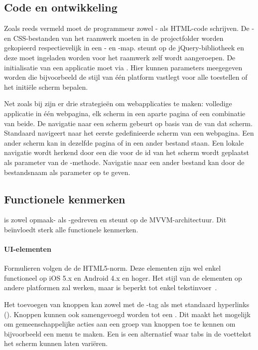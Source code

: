 \subsection{Code en ontwikkeling}
Zoals reeds vermeld moet de programmeur zowel \js{}- als HTML-code schrijven. 
De \js{}- en CSS-bestanden van het raamwerk moeten in de projectfolder worden gekopieerd respectievelijk in een - en -map.
\kendo{} steunt op de jQuery-bibliotheek en deze moet ingeladen worden voor het \kendo{} raamwerk zelf wordt aangeroepen.
De initialisatie van een applicatie moet via .
Hier kunnen parameters meegegeven worden die bijvoorbeeld de stijl van één platform vastlegt voor alle toestellen of het initiële scherm bepalen.

Net zoals bij \jqm{} zijn er drie strategieën om webapplicaties te maken:  volledige applicatie in één webpagina,  elk scherm in een aparte pagina of een combinatie van beide.
De navigatie naar een scherm gebeurt op basis van de  van dat scherm.
Standaard navigeert \kendo{} naar het eerste gedefinieerde scherm van een webpagina.
Een ander scherm kan in dezelfde pagina of in een ander bestand staan.
Een lokale navigatie wordt herkend door een  die voor de id van het scherm wordt geplaatst als parameter van de -methode.
Navigatie naar een ander bestand kan door de bestandsnaam als parameter op te geven.

\subsection{Functionele kenmerken}
\label{sec:kendo-functioneel}
\kendo{} is zowel opmaak- als \js{}-gedreven en steunt op de MVVM-architectuur.
Dit beïnvloedt sterk alle functionele kenmerken.

\paragraph{UI-elementen}
Formulieren volgen de de HTML5-norm. 
Deze elementen zijn wel enkel functioneel op iOS 5.x en Android 4.x en hoger.  
Het stijl van de elementen op andere platformen zal werken, maar is beperkt tot  enkel tekstinvoer~\cite{Telerike}.

Het toevoegen van knoppen kan zowel met de -tag als met standaard hyperlinks ().
Knoppen kunnen ook samengevoegd worden tot een .
Dit maakt het mogelijk om gemeenschappelijke acties aan een groep van knoppen toe te kennen om bijvoorbeeld een menu te maken.
Een  is een alternatief waar tabs in de voettekst het scherm kunnen laten variëren.

